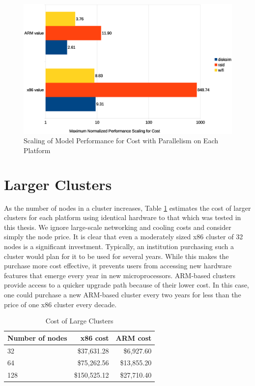 \documentclass[11pt]{book}
\begin{document}
\begin{figure}
\centering
\includegraphics[width=\textwidth]{costperf_summary}
\caption{Scaling of Model Performance for Cost with Parallelism on Each Platform}
\label{costperf-summary}
\end{figure}

\section{Larger Clusters}

As the number of nodes in a cluster increases, Table \ref{cost-table} estimates the cost
of larger clusters for each platform using identical hardware to that which was tested in
this thesis.  We ignore large-scale networking and cooling costs and consider simply the
node price.  It is clear that even a moderately sized x86 cluster of 32 nodes is a
significant investment.  Typically, an institution purchasing such a cluster would plan
for it to be used for several years.  While this makes the purchase more cost effective,
it prevents users from accessing new hardware features that emerge every year in new
microprocessors.  ARM-based clusters provide access to a quicker upgrade path because of
their lower cost.  In this case, one could purchase a new ARM-based cluster every two
years for less than the price of one x86 cluster every decade.

\begin{table}[h]
\caption{Cost of Large Clusters}
\label{cost-table}
\centering
\begin{tabular}{| l | r | r |}
  \hline
  Number of nodes & x86 cost & ARM cost \\
  \hline
  32 & \$37,631.28 & \$6,927.60 \\
  64 & \$75,262.56 & \$13,855.20 \\
  128 & \$150,525.12 & \$27,710.40 \\
  \hline
\end{tabular}
\end{table}
\end{document}
